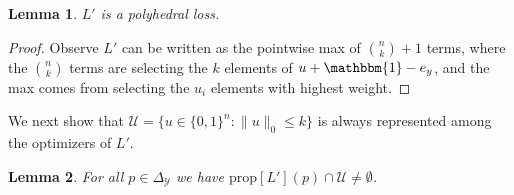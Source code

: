\documentclass[12pt]{article}
\newcommand{\prop}[1]{\mathrm{prop}[#1]}
\newcommand{\simplex}{\Delta_\Y}
\newcommand{\U}{\mathcal{U}}
\newcommand{\Y}{\mathcal{Y}}
\newcommand{\risk}[1]{\underline{#1}}
\newcommand{\ones}{\mathbbm{1}}
\newtheorem{lemma}{Lemma}
\begin{document}
\begin{lemma}\label{lem:top-k-polyhedral}
$L'$ is a polyhedral loss.
\end{lemma}
\begin{proof}
Observe $L'$ can be written as the pointwise max of $\binom{n}{k} +1$ terms, where the $\binom{n}{k}$ terms are selecting the $k$ elements of $u + \ones - e_y$, and the max comes from selecting the $u_i$ elements with highest weight.
\end{proof}

We next show that $\U = \{u \in \{0,1\}^n : \|u\|_0 \leq k\}$ is always represented among the optimizers of $L'$. \begin{lemma}\label{lem:top-k-optimal-corners}
  For all $p \in \simplex$ we have $\prop{L'}(p) \cap \U \neq \emptyset$.
\end{lemma}
\end{document}
